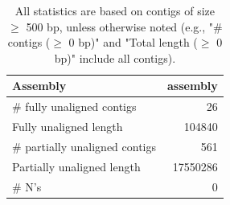 \documentclass[12pt,a4paper]{article}
\begin{document}
\begin{table}[ht]
\begin{center}
\caption{All statistics are based on contigs of size $\geq$ 500 bp, unless otherwise noted (e.g., "\# contigs ($\geq$ 0 bp)" and "Total length ($\geq$ 0 bp)" include all contigs).}
\begin{tabular}{|l*{1}{|r}|}
\hline
Assembly & assembly \\ \hline
\# fully unaligned contigs & 26 \\ \hline
Fully unaligned length & 104840 \\ \hline
\# partially unaligned contigs & 561 \\ \hline
Partially unaligned length & 17550286 \\ \hline
\# N's & 0 \\ \hline
\end{tabular}
\end{center}
\end{table}
\end{document}
